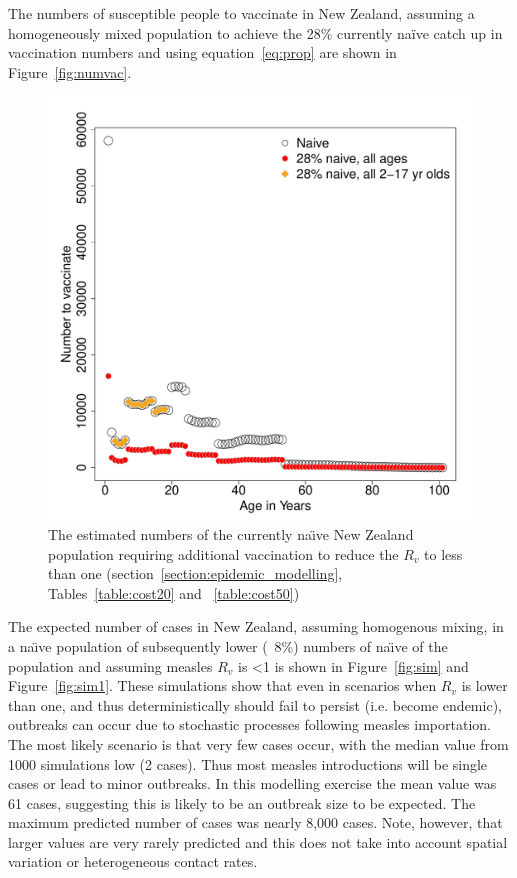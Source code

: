 \documentclass{article}
\begin{document}
The numbers of susceptible people to vaccinate in New Zealand, assuming a homogeneously mixed population to achieve the 28\% currently na\"{i}ve catch up in vaccination numbers and using equation~\autoref{eq:prop} are shown in Figure~\autoref{fig:numvac}.


\begin{figure}[width=1\textwidth]
     \centering
\includegraphics{draftfinalreport-061}
     \caption{The estimated numbers of the currently na\"{\i}ve New Zealand population requiring additional vaccination to reduce the $R_v$ to less than one (section~\autoref{section:epidemic_modelling}, Tables~\autoref{table:cost20} and ~\autoref{table:cost50})}
     \label{fig:numvac}
\end{figure}

The expected number of cases in New Zealand, assuming homogenous mixing, in a na\"{\i}ve population of subsequently lower (~8\%) numbers of na\"{\i}ve of the population and assuming measles $R_v$ is <1 is shown in Figure~\autoref{fig:sim} and Figure~\autoref{fig:sim1}. These simulations show that even in scenarios when $R_v$ is lower than one, and thus deterministically should fail to persist (i.e. become endemic), outbreaks can occur due to stochastic processes following measles importation. The most likely scenario is that very few cases occur, with the median value from 1000 simulations low (2 cases). Thus most measles introductions will be single cases or lead to minor outbreaks. In this modelling exercise the mean value was 61 cases, suggesting this is likely to be an outbreak size to be expected. The maximum predicted number of cases was nearly 8,000 cases. Note, however, that larger values are very rarely predicted and this does not take into account spatial variation or heterogeneous contact rates.
\end{document}
